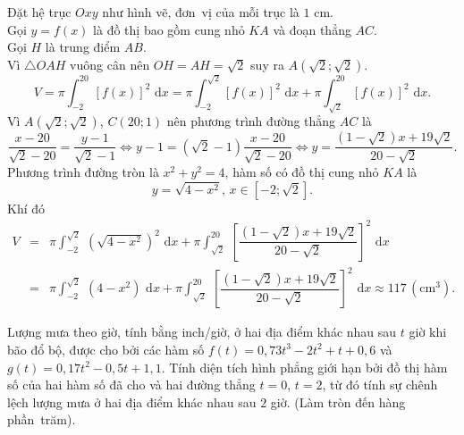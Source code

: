\begin{bt}
{\begin{center}
		\end{center}
		Đặt hệ  trục $Oxy$ như hình vẽ, đơn~vị của mỗi trục là $1$ cm.\\
		Gọi $y=f(x)$ là đồ thị bao gồm cung nhỏ $KA$  và đoạn thẳng $AC$.\\
		Gọi  $H$ là trung điểm $AB$.\\
		Vì  $\triangle OAH$ vuông cân nên $OH=AH=\sqrt{2}$ suy ra $A\left(\sqrt{2};\sqrt{2}\right)$.
		 $$V=\pi\displaystyle\int^{20}_{-2}\left[f(x)\right]^2\,\mathrm{\,d}x=\pi\displaystyle\int^{\sqrt{2}}_{-2}\left[f(x)\right]^2\,\mathrm{\,d}x+\pi\displaystyle\int^{20}_{\sqrt{2}}\left[f(x)\right]^2\,\mathrm{\,d}x.$$
		Vì $A\left(\sqrt{2};\sqrt{2}\right)$, $C(20;1)$  nên phương trình đường thẳng $AC$ là
		\[\dfrac{x-20}{\sqrt{2}-20}=\dfrac{y-1}{\sqrt{2}-1}\Leftrightarrow  y-1=(\sqrt{2}-1)\dfrac{x-20}{\sqrt{2}-20}\Leftrightarrow y=\dfrac{(1-\sqrt{2})x+19\sqrt{2}}{20-\sqrt{2}}.\]
		Phương trình đường tròn là $x^2+y^2=4$, hàm số có  đồ thị cung nhỏ $KA$ là
		$$y=\sqrt{4-x^2},\,x\in  [-2;\sqrt{2}].$$
		Khí đó 
		 \allowdisplaybreaks
		\begin{eqnarray*}
			V&=&\pi\displaystyle\int^{\sqrt{2}}_{-2}\ {\left(\sqrt{4-x^2}\right)}^2\,\mathrm{\,d}x+\pi\displaystyle\int^{20}_{\sqrt{2}}\  {\left[\dfrac{(1-\sqrt{2})x+19\sqrt{2}}{20-\sqrt{2}}\right]}^2\,\mathrm{\,d}x\\
			&=&\pi\displaystyle\int^{\sqrt{2}}_{-2}\ \left(4-x^2\right)\,\mathrm{\,d}x+\pi\displaystyle\int^{20}_{\sqrt{2}}\ {\left[\dfrac{(1-\sqrt{2})x+19\sqrt{2}}{20-\sqrt{2}}\right]}^2\,\mathrm{\,d}x\approx  117\,\left(\text{cm}^3\right).
		\end{eqnarray*}
	 }
\end{bt}

\begin{bt}%
	Lượng mưa theo giờ, tính bằng inch/giờ, ở hai địa điểm khác nhau sau $t$ giờ khi bão đổ bộ, được cho bởi các hàm số $f(t) = 0{,}73t^3-2t^2+t+0{,}6$ và $g(t)=0{,}17t^2-0{,}5t+1{,}1$. Tính diện tích hình phẳng giới hạn bởi đồ thị hàm số của hai hàm số đã cho và hai đường thẳng $t=0$, $t=2$, từ đó tính sự chênh lệch lượng mưa ở hai địa điểm khác nhau sau $2$ giờ. (Làm tròn đến hàng phần~trăm). 
\end{bt}

